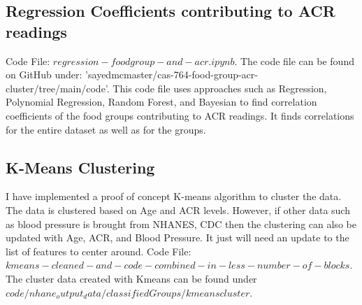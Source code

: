 \subsection{Regression Coefficients contributing to ACR readings}
Code File: $regression-foodgroup-and-acr.ipynb$. The code file can be found on GitHub under: 'sayedmcmaster/cas-764-food-group-acr-cluster/tree/main/code'. This code file uses approaches such as Regression, Polynomial Regression, Random Forest, and Bayesian to find correlation coefficients of the food groups contributing to ACR readings. It finds correlations for the entire dataset as well as for the groups.

\subsection{K-Means Clustering}
I have implemented a proof of concept K-means algorithm to cluster the data. The data is clustered based on Age and ACR levels. However, if other data such as blood pressure is brought from NHANES, CDC then the clustering can also be updated with Age, ACR, and Blood Pressure. It just will need an update to the list of features to center around.
Code File: $kmeans-cleaned-and-code-combined-in-less-number-of-blocks$. The cluster data created with Kmeans can be found under $code/nhane_output_data/classifiedGroups/kmeanscluster$.
